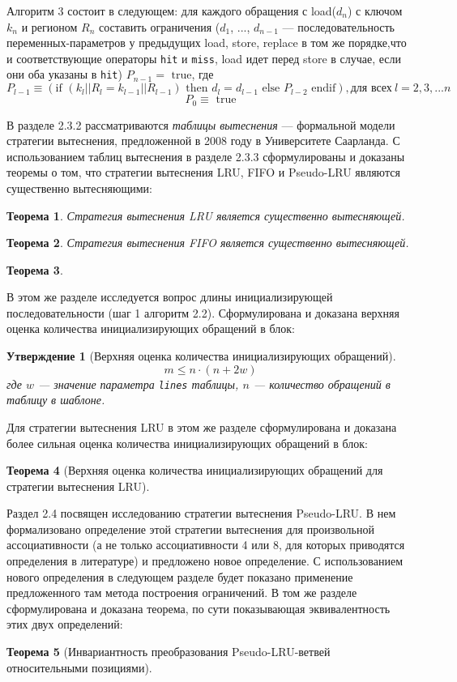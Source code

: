 \documentclass[14pt,autoref,href
,facsimile
]{disser}
\newtheorem{utv}{Утверждение}
\newtheorem{theorem}{Теорема}
\newcommand{\LRU}{LRU\xspace}
\newcommand{\PseudoLRU}{Pseudo-LRU\xspace}
\begin{document}
Алгоритм 3 состоит в следующем: для каждого обращения с load($d_n$) с ключом $k_n$ и регионом $R_n$ составить ограничения ($d_1$, ..., $d_{n-1}$ --- последовательность переменных-параметров у предыдущих load, store, replace в том же порядке,что и соответствующие операторы \texttt{hit} и \texttt{miss}, load идет перед store в случае, если они оба указаны в \texttt{hit}) $P_{n-1} = \mbox{~true}$, где
$$P_{l-1} \equiv (\mbox{if~} (k_l||R_l = k_{l-1}||R_{l-1}) \mbox{~then~} d_l =
d_{l-1} \mbox{~else~} P_{l-2} \mbox{~endif}), \mbox{для всех}~l = 2, 3, ... n$$
$$P_0 \equiv \mbox{~true}$$

В разделе 2.3.2 рассматриваются \emph{таблицы вытеснения} --- формальной модели стратегии вытеснения, предложенной в 2008 году в Университете Саарланда. С использованием таблиц вытеснения в разделе 2.3.3 сформулированы и доказаны теоремы о том, что стратегии вытеснения LRU, FIFO и Pseudo-LRU являются существенно вытесняющими:
\begin{theorem}\label{thm:LRU_essential}
Стратегия вытеснения LRU является существенно вытесняющей.
\end{theorem}

\begin{theorem}
  Стратегия вытеснения FIFO является существенно вытесняющей.
\end{theorem}

\begin{theorem}\label{thm:PseudoLRU_essential} \PseudoLRUEssential \end{theorem}

В этом же разделе исследуется вопрос длины инициализирующей последовательности (шаг 1 алгоритм 2.2). Сформулирована и доказана верхняя оценка количества инициализирующих обращений в блок:
\begin{utv}[Верхняя оценка количества инициализирующих обращений]
$$m \leqslant n \cdot (n + 2w)$$ где $w$ --- значение параметра \texttt{lines} таблицы, $n$ --- количество обращений в таблицу в шаблоне.
\end{utv}

Для стратегии вытеснения LRU в этом же разделе сформулирована и доказана более сильная оценка количества инициализирующих обращений в блок:
\begin{theorem}[Верхняя оценка количества инициализирующих обращений для
стратегии вытеснения \LRU]\label{thm_mirror_lenth_lru} \UpperBoundLRUMirror
\end{theorem}

Раздел 2.4 посвящен исследованию стратегии вытеснения Pseudo-LRU. В нем формализовано определение этой стратегии вытеснения для произвольной ассоциативности (а не только ассоциативности 4 или 8, для которых приводятся определения в литературе) и предложено новое определение. С использованием нового определения в следующем разделе будет показано применение предложенного там метода построения ограничений. В том же разделе сформулирована и доказана теорема, по сути показывающая эквивалентность этих двух определений:
\begin{theorem}[Инвариантность преобразования \PseudoLRU-ветвей относительными
позициями]\label{thm_pseudoLRU_invariant} \PseudoLRUInvariant
\end{theorem}
\end{document}
